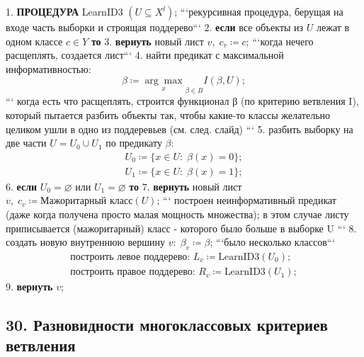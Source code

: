 1. \textbf{ПРОЦЕДУРА} LearnID3 ${\left( U \subseteq X^l \right)}$;
```рекурсивная процедура, берущая на входе часть выборки и строящая поддерево```
2. \textbf{если} все объекты из $U$ лежат в одном классе $c \in Y$ \textbf{то}
3. \textbf{вернуть} новый лист $v, \; c_v \coloneqq c$;
    ```когда нечего расщеплять, создается лист```
4. найти предикат с максимальной информативностью:
$$\beta \coloneqq {\underset{x}{\arg\max}}_{\beta \in B}{I{\left( \beta, U \right)}};$$
```
когда есть что расщеплять, строится функционал β (по критерию ветвления
I), который пытается разбить объекты так, чтобы какие-то классы желательно
целиком ушли в одно из поддеревьев (см. след. слайд)
```
5. разбить выборку на две части $U = U_0 \cup U_1$ по предикату $\beta$:
$$
\begin{matrix}
U_0 \coloneqq {\lbrace x \in U: \; \beta{(x)} = 0 \rbrace};\\
U_1 \coloneqq {\lbrace x \in U: \; \beta{(x)} = 1 \rbrace};
\end{matrix}
$$
6. \textbf{если} $U_0 = \varnothing$ или $U_1 = \varnothing$ \textbf{то}
7. \textbf{вернуть} новый лист
$v, \; c_v \coloneqq \text{Мажоритарный класс}{\left( U \right)}$;
```
построен неинформативный предикат (даже когда получена просто малая
мощность множества);
в этом случае листу приписывается (мажоритарный) класс - которого было
больше в выборке U
```
8. создать новую внутреннюю вершину $v: \; \beta_v \coloneqq \beta$;
```было несколько классов```
$$
\begin{matrix}
\text{построить левое поддерево: } L_v \coloneqq \text{LearnID3}{\left( U_0 \right)};\\
\text{построить правое поддерево: } R_v \coloneqq \text{LearnID3}{\left( U_1 \right)};
\end{matrix}
$$
9. \textbf{вернуть} $v$;

\subsection{30. Разновидности многоклассовых критериев ветвления}

